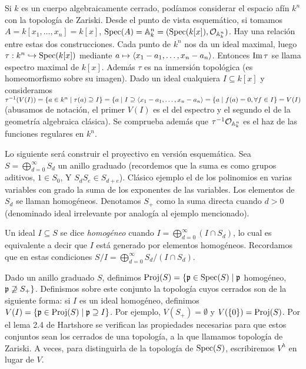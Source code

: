 \documentclass[GA.tex]{subfiles}
\begin{document}
\begin{ej}
Si $k$ es un cuerpo algebraicamente cerrado, podíamos considerar el espacio afín $k^n$ con la topología de Zariski. Desde el punto de vista esquemático, si tomamos $A=k[x_1,\dots, x_n]=k[x]$, $\operatorname{Spec}(A)=\mathbb{A}_k^n=(\operatorname{Spec}(k[x]),{\mathcal O}_{\mathbb{A}_k^n})$. Hay una relación entre estas dos construcciones. Cada punto de $k^n$ nos da un ideal maximal, luego $\tau:k^n\hookrightarrow\operatorname{Spec}(k[x])$ mediante $a\mapsto \langle{x_1-a_1, \dots, x_n-a_n}\rangle$. Entonces $\operatorname{Im}\tau$ se llama espectro maximal de $k[x]$. Además $\tau$ es na inmersión topológica (es homeomorfismo sobre su imagen). Dado un ideal cualquiera $I\subseteq k[x]$ y consideramos $\tau^{-1}(V(I))=\{a\in k^n\mid \tau(a)\supseteq I\}=\{a\mid I\supseteq \langle{x_1-a_1, \dots, x_n-a_n}\rangle=\{a\mid f(a)=0, \forall f\in I\}=V(I)$ (abusamos de notación, el primer $V(I)$ es el del espectro y el segundo el de la geometría algebraica clásica). Se comprueba además que $\tau^{-1}{\mathcal O}_{\mathbb{A}_k^n}$ es el haz de las funciones regulares en $k^n$. 
\end{ej}

Lo siguiente será construir el proyectivo en versión esquemática. Sea $S=\bigoplus_{d=0}^{\infty}S_d$ un anillo graduado (recordemos que la suma es como grupos aditivos, $1\in S_0$, Y $S_dS_e\in S_{d+e}$). Clásico ejemplo el de los polinomios en varias variables con grado la suma de los exponentes de las variables. Los elementos de $S_d$ se llaman homogéneos. Denotamos $S_+$ como la suma directa cuando $d>0$ (denominado ideal irrelevante por analogía al ejemplo mencionado). 

\begin{defi}
Un ideal $I\subseteq S$ se dice \emph{homogéneo} cuando $I=\bigoplus_{d=0}^{\infty}(I\cap S_d)$, lo cual es equivalente a decir que $I$ está generado por elementos homogéneos. Recordamos que en estas condiciones $S/I=\bigoplus_{d=0}^{\infty}S_d/(I\cap S_d)$.
\end{defi} 

Dado un anillo graduado $S$, definimos $\operatorname{Proj}(S)=\{{\mathfrak{p}}\in\operatorname{Spec}(S)\mid {\mathfrak{p}}$ homogéneo, ${\mathfrak{p}}\not\supseteq S_+\}$. Definismos sobre este conjunto la topología cuyos cerrados son de la siguiente forma: si $I$ es un ideal homogéneo, definimos $V(I)=\{{\mathfrak{p}}\in\operatorname{Proj}(S)\mid {\mathfrak{p}}\supseteq I\}$. Por ejemplo, $V(S_+)=\emptyset$ y $V(\{0\})=\operatorname{Proj}(S)$. Por el lema 2.4 de Hartshore se verifican las propiedades necesarias para que estos conjuntos sean los cerrados de una topología, a la que llamamos topología de Zariski. A veces, para distinguirla de la topología de $\operatorname{Spec}(S)$, escribiremos $V^h$ en lugar de $V$.
\end{document}
